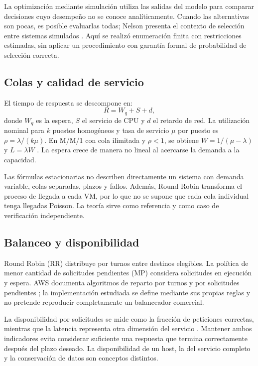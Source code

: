 La optimización mediante simulación utiliza las salidas del modelo para comparar decisiones cuyo desempeño no se conoce analíticamente. Cuando las alternativas son pocas, es posible evaluarlas todas; Nelson presenta el contexto de selección entre sistemas simulados \cite{nelson}. Aquí se realizó enumeración finita con restricciones estimadas, sin aplicar un procedimiento con garantía formal de probabilidad de selección correcta.

\subsection{Colas y calidad de servicio}
El tiempo de respuesta se descompone en:
\begin{equation}
R=W_q+S+d,
\label{eq:respuesta}
\end{equation}
donde $W_q$ es la espera, $S$ el servicio de CPU y $d$ el retardo de red. La utilización nominal para $k$ puestos homogéneos y tasa de servicio $\mu$ por puesto es $\rho=\lambda/(k\mu)$. En M/M/1 con cola ilimitada y $\rho<1$, se obtiene $W=1/(\mu-\lambda)$ y $L=\lambda W$ \cite{colas}. La espera crece de manera no lineal al acercarse la demanda a la capacidad.

Las fórmulas estacionarias no describen directamente un sistema con demanda variable, colas separadas, plazos y fallos. Además, Round Robin transforma el proceso de llegada a cada VM, por lo que no se supone que cada cola individual tenga llegadas Poisson. La teoría sirve como referencia y como caso de verificación independiente.

\subsection{Balanceo y disponibilidad}
Round Robin (RR) distribuye por turnos entre destinos elegibles. La política de menor cantidad de solicitudes pendientes (MP) considera solicitudes en ejecución y espera. AWS documenta algoritmos de reparto por turnos y por solicitudes pendientes \cite{aws}; la implementación estudiada se define mediante sus propias reglas y no pretende reproducir completamente un balanceador comercial.

La disponibilidad por solicitudes se mide como la fracción de peticiones correctas, mientras que la latencia representa otra dimensión del servicio \cite{sre}. Mantener ambos indicadores evita considerar suficiente una respuesta que termina correctamente después del plazo deseado. La disponibilidad de un host, la del servicio completo y la conservación de datos son conceptos distintos.
